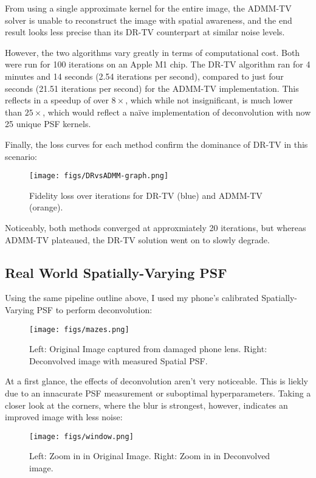 \documentclass[sigconf]{acmart}
\begin{document}
From using a single approximate kernel for the entire image, the ADMM-TV solver is unable to reconstruct the image with spatial awareness, and the end result looks less precise than its DR-TV counterpart at similar noise levels. 

However, the two algorithms vary greatly in terms of computational cost. Both were run for 100 iterations on an Apple M1 chip. The DR-TV algorithm ran for 4 minutes and 14 seconds (2.54 iterations per second), compared to just four seconds (21.51 iterations per second) for the ADMM-TV implementation. This reflects in a speedup of over $8 \times$, which while not insignificant, is much lower than $25\times$, which would reflect a naïve implementation of deconvolution with now 25 unique PSF kernels.

Finally, the loss curves for each method confirm the dominance of DR-TV in this scenario:
\begin{figure}[h]
  \centering
  \texttt{[image: figs/DRvsADMM-graph.png]}
  \caption{Fidelity loss over iterations for DR-TV (blue) and ADMM-TV (orange).}
  \label{fig:dr-randres}
\end{figure}
Noticeably, both methods converged at approxmiately 20 iterations, but whereas ADMM-TV plateaued, the DR-TV solution went on to slowly degrade.

\subsection{Real World Spatially-Varying PSF}
Using the same pipeline outline above, I used my phone's calibrated Spatially-Varying PSF to perform deconvolution:
\begin{figure}[h]
  \centering
  \texttt{[image: figs/mazes.png]}
  \caption{Left: Original Image captured from damaged phone lens. Right: Deconvolved image with measured Spatial PSF.}
  \label{fig:mazes}
\end{figure}

At a first glance, the effects of deconvolution aren't very noticeable. This is liekly due to an innacurate PSF measurement or suboptimal hyperparameters. Taking a closer look at the corners, where the blur is strongest, however, indicates an improved image with less noise:

\begin{figure}[h]
  \centering
  \texttt{[image: figs/window.png]}
  \caption{Left: Zoom in in Original Image. Right: Zoom in in Deconvolved image.}
  \label{fig:dr-randres}
\end{figure}
\end{document}
